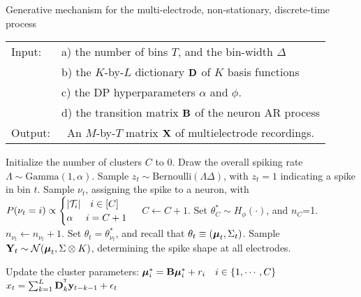 \begin{algorithm}
\caption{Generative mechanism for the multi-electrode, non-stationary, discrete-time process}\label{alg:gen_proc}
\begin{tabular}{p{1.2cm}p{12.4cm}}
Input:&  a) the number of bins $T$, and the bin-width $\Delta$\\
  &  b) the $K$-by-$L$ dictionary $\mathbf{D}$ of $K$ basis functions\\
  &  c) the DP hyperparameters $\alpha$ and $\phi$.\\ 
  &  d) the transition matrix $\mathbf{B}$ of the neuron AR process \\
Output:& \  An $M$-by-$T$ matrix $\mathbf{X}$ of multielectrode recordings. %
\end{tabular}
\begin{algorithmic}[1]
\State Initialize the number of clusters $C$ to $0$.
\State Draw the overall spiking rate $\Lambda \sim \text{Gamma}(1,\alpha)$.
\State Sample $z_t \sim \text{Bernoulli}(\Lambda \Delta)$, with $z_t = 1$ indicating a spike in bin $t$.
   \label{enum:thin}
  \State Sample $\nu_t$, assigning the spike to a neuron, with
$  P({\nu_t} = i) \propto 
  \begin{cases}
   |\mathcal{T}_i| \quad i \in [C] \\
   \alpha \quad\ i = C + 1 \\
  \end{cases}$
          \State  $C \leftarrow C + 1$. 
		\State Set $\theta^*_{C} \sim H_{\phi}(\cdot)$, and $n_C$=1.
       \Else \State  $n_{\nu_t} \leftarrow n_{\nu_t}+1$.
    \EndIf
\State Set $\theta_t = \theta^*_{\nu_t}$, and recall that $\theta_t \equiv (\boldsymbol{\mu}_t, \Sigma_t)$.
\State Sample $\bY_t %
           \sim \mathcal{N}(\mb{\mu}_t, \Sigma \otimes K)$, determining the spike shape at all electrodes. 
\EndIf

\State Update the cluster parameters: ${\boldsymbol{\mu}}^*_i = \mathbf{B} {\boldsymbol{\mu}}^*_i + r_i \quad i \in \{1, \cdots, C\}$
\State $x_t = \sum_{k = 1}^L \mathbf{D}_{k}^{^{\mathsf{T}}} \mathbf{y}_{t-k-1} + \epsilon_t$
\EndFor
\State {}
\end{algorithmic}
\end{algorithm}


